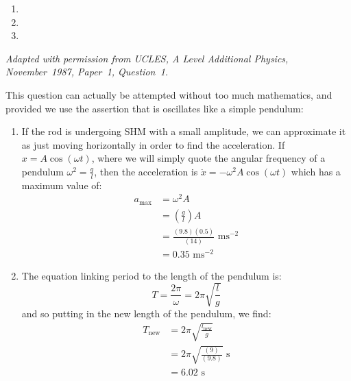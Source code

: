 

\begin{problem}
{
\begin{enumerate}
		\item {}
		\item {}
		\item {}
\end{enumerate}
}
{\textit{Adapted with permission from UCLES, A Level Additional Physics, November~1987, Paper~1, Question~1.}}
{This question can actually be attempted without too much mathematics, and provided we use the assertion that is oscillates like a simple pendulum:
\begin{enumerate}
	\item If the rod is undergoing SHM with a small amplitude, we can approximate it as just moving horizontally in order to find the acceleration.
If $x = A\cos(\omega t)$, where we will simply quote the angular frequency of a pendulum $\omega^{2} = \frac{g}{l}$, then the acceleration is $\ddot{x} = -\omega^{2}A \cos(\omega t)$ which has a maximum value of:
\begin{align*} 
a_{\textrm{max}} &= \omega^{2}A \\ 
&= \left(\frac{g}{l}\right)A \\ 
&= \frac{(9.8)(0.5)}{(14)} \textrm{ ms}^{-2} \\ 
&= 0.35 \textrm{ ms}^{-2} 
\end{align*}


	\item The equation linking period to the length of the pendulum is: 
\begin{equation*}
 T = \frac{2 \pi}{\omega} = 2\pi \sqrt{\frac{l}{g}}
\end{equation*} 
and so putting in the new length of the pendulum, we find: 
\begin{align*}
T_{\textrm{new}} &= 2\pi \sqrt{\frac{l_{\textrm{new}}}{g}} \\ 
&= 2\pi \sqrt{\frac{(9)}{(9.8)}} \textrm{ s} \\ 
&= 6.02 \textrm{ s}


\end{align*}
\end{enumerate}}
\end{problem}
